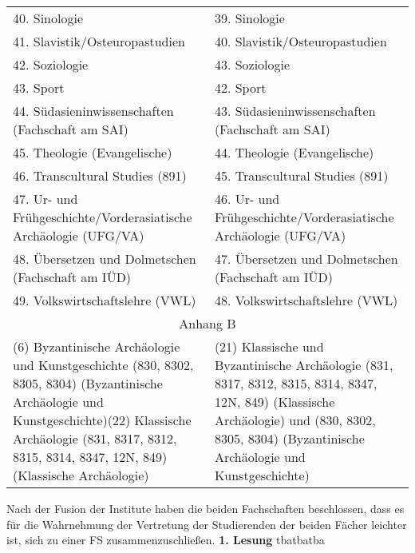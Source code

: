 {\begin{longtable}{|p{7.5cm}|p{7.5cm}|}
        40. Sinologie                                                    & 39. Sinologie                                                    \\
        41. Slavistik/Osteuropastudien                                   & 40. Slavistik/Osteuropastudien                                   \\
        42. Soziologie                                                   & 43. Soziologie                                                   \\
        43. Sport                                                        & 42. Sport                                                        \\
        44. Südasieninwissenschaften (Fachschaft am SAI)                 & 43. Südasieninwissenschaften (Fachschaft am SAI)                 \\
        45. Theologie (Evangelische)                                     & 44. Theologie (Evangelische)                                     \\
        46. Transcultural Studies (891)                                  & 45. Transcultural Studies (891)                                  \\
        47. Ur- und Frühgeschichte/Vorderasiatische Archäologie (UFG/VA) & 46. Ur- und Frühgeschichte/Vorderasiatische Archäologie (UFG/VA) \\
        48. Übersetzen und Dolmetschen (Fachschaft am IÜD)               & 47. Übersetzen und Dolmetschen (Fachschaft am IÜD)               \\
        49. Volkswirtschaftslehre (VWL)                                  & 48. Volkswirtschaftslehre (VWL)                                  \\
        \multicolumn{2}{|c|}{Anhang B}\\\hline
        (6) Byzantinische Archäologie und Kunstgeschichte (830, 8302, 8305, 8304)
 (Byzantinische Archäologie und Kunstgeschichte)\newline (22) Klassische Archäologie (831, 8317, 8312, 8315, 8314, 8347, 12N, 849) (Klassische
 Archäologie) & (21) Klassische und Byzantinische Archäologie (831, 8317, 8312, 8315, 8314, 8347,
 12N, 849) (Klassische Archäologie) und (830, 8302, 8305, 8304) (Byzantinische
 Archäologie und Kunstgeschichte)\\
    \end{longtable}
}{
    Nach der Fusion der Institute haben die beiden Fachschaften beschlossen, dass es für die Wahrnehmung der Vertretung der Studierenden der beiden Fächer leichter ist, sich zu einer FS zusammenzuschließen.
}{
    \textbf{1. Lesung}
    \ul{}
}{tba}{tba}{tba}

